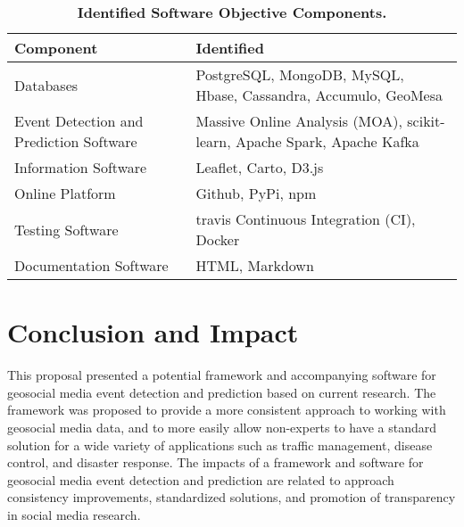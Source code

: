 \begin{table}[!htb]
\centering
\caption{\textbf{Identified Software Objective Components.}}
\label{table:softwarecomponents}
\begin{tabular}{|p{2.5in}|p{3.5in}|}
\hline
\textbf{Component} & \textbf{Identified}\\
\hline
Databases & PostgreSQL, MongoDB, MySQL, Hbase, Cassandra, Accumulo, GeoMesa\\
\hline
Event Detection and Prediction Software & Massive Online Analysis (MOA), scikit-learn, Apache Spark, Apache Kafka\\
\hline
Information Software & Leaflet, Carto, D3.js\\
\hline
Online Platform & Github, PyPi, npm\\
\hline
Testing Software & travis Continuous Integration (CI), Docker\\
\hline
Documentation Software & HTML, Markdown\\
\hline
\end{tabular}
\end{table}




\section{Conclusion and Impact} \label{conclusion-and-impact}

This proposal presented a potential framework and accompanying software for geosocial media event detection and prediction based on current research. The framework was proposed to provide a more consistent approach to working with  geosocial media data, and to more easily allow non-experts to have a standard solution for a wide variety of applications such as traffic management, disease control, and disaster response. The impacts of a framework and software for geosocial media event detection and prediction are related to approach consistency improvements, standardized solutions, and promotion of transparency in social media research.

